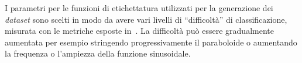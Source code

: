 I parametri per le funzioni di etichettatura utilizzati per la generazione dei \emph{dataset} sono scelti in modo da avere vari livelli di ``difficoltà'' di classificazione, misurata con le metriche esposte in~.
La difficoltà può essere gradualmente aumentata per esempio stringendo progressivamente il paraboloide o aumentando la frequenza o l'ampiezza della funzione sinusoidale.

